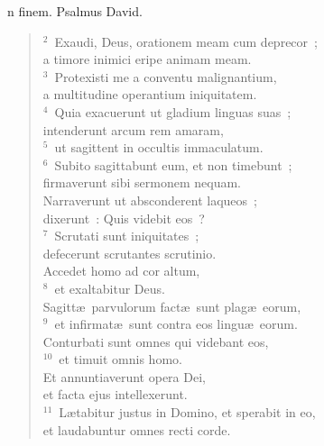 \bchapter
{}n finem. Psalmus David.
\begin{flushleft}\begin{verse}\vspace{6pt}${}^{2}$~Exaudi, Deus, orationem meam cum deprecor~;\\ a timore inimici eripe animam meam.\\
${}^{3}$~Protexisti me a conventu malignantium,\\ a multitudine operantium iniquitatem.\\
${}^{4}$~Quia exacuerunt ut gladium linguas suas~;\\ intenderunt arcum rem amaram,\\
${}^{5}$~ut sagittent in occultis immaculatum.\\
${}^{6}$~Subito sagittabunt eum, et non timebunt~;\\ firmaverunt sibi sermonem nequam.\\ Narraverunt ut absconderent laqueos~;\\ dixerunt~: Quis videbit eos~?\\
${}^{7}$~Scrutati sunt iniquitates~;\\ defecerunt scrutantes scrutinio.\\ Accedet homo ad cor altum,\\
${}^{8}$~et exaltabitur Deus.\\ Sagitt\ae\ parvulorum fact\ae\ sunt plag\ae\ eorum,\\
${}^{9}$~et infirmat\ae\ sunt contra eos lingu\ae\ eorum.\\ Conturbati sunt omnes qui videbant eos,\\
${}^{10}$~et timuit omnis homo.\\ Et annuntiaverunt opera Dei,\\ et facta ejus intellexerunt.\\
${}^{11}$~L\ae tabitur justus in Domino, et sperabit in eo,\\ et laudabuntur omnes recti corde.\end{verse}\end{flushleft}



